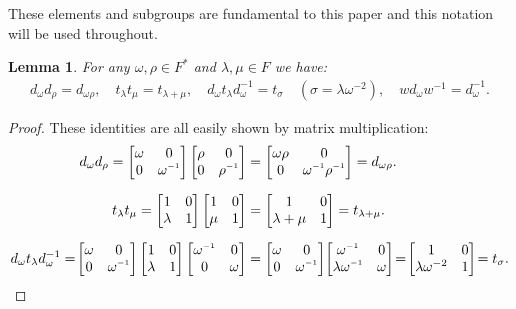 \documentclass[a4paper , 11pt]{book}
\newtheorem{lemma}[theorem]{Lemma}
\theoremstyle{definition}
\theoremstyle{remark}
\newcommand{\inv}{^{\raisebox{.2ex}{$\scriptscriptstyle-1$}}}
\begin{document}
These elements and subgroups are fundamental to this paper and this notation will be used throughout.

\begin{lemma}\label{6.1}
For any $\omega, \rho \in F^*$ and $\lambda, \mu \in F$ we have:
\begin{align*} d_\omega d_{\rho}= d_{\omega\rho}, \quad t_\lambda t_\mu = t_{\lambda + \mu}, \quad d_\omega t_\lambda d^{-1}_\omega = t_\sigma \quad \! \! (\sigma=\lambda \omega^{-2}), \quad w d_\omega w^{-1} = d^{-1}_\omega.
\end{align*} 
\end{lemma}
\vspace{0mm}

\begin{proof} 
These identities are all easily shown by matrix multiplication:
\begin{align*} d_\omega d_\rho = \begin{bmatrix} \omega & 0 \\ 0 & \omega\inv \end{bmatrix} \begin{bmatrix} \rho & 0 \\ 0 & \rho\inv \end{bmatrix} &= \begin{bmatrix} \omega \rho & 0 \\ 0 & \omega\inv \rho\inv \end{bmatrix} = d_{\omega \rho}.
\\[1.5ex]
t_\lambda t_\mu = \begin{bmatrix} 1 & 0 \\ \lambda & 1 \end{bmatrix} \begin{bmatrix} 1 & 0 \\ \mu & 1 \end{bmatrix} &= \begin{bmatrix} 1 & 0 \\ \lambda + \mu & 1 \end{bmatrix} = t_{\lambda + \mu}.
\\[1.5ex]
 d_\omega t_\lambda d^{-1}_\omega = \! \begin{bmatrix} \omega & 0 \\ 0 & \omega\inv \end{bmatrix} \begin{bmatrix} 1 & 0 \\ \lambda & 1 \end{bmatrix} \begin{bmatrix} \omega\inv & 0 \\ 0 & \omega \end{bmatrix} &= \begin{bmatrix} \omega & 0 \\ 0 & \omega\inv \end{bmatrix} \! \begin{bmatrix} \omega\inv & 0 \\ \lambda \omega\inv & \omega \end{bmatrix} \! = \! \begin{bmatrix} 1 & 0 \\ \lambda \omega^{-2} & 1 \end{bmatrix} \! = t_\sigma.

\end{align*}
\end{proof}
\end{document}
